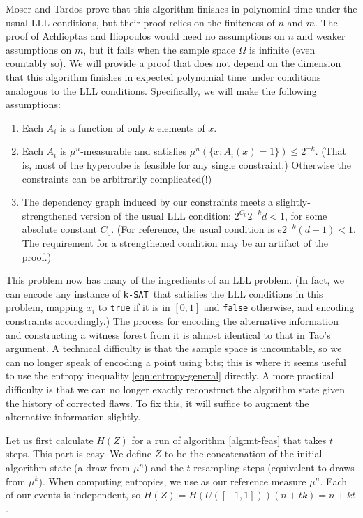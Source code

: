 \documentclass[twocolumn]{article}
\newcommand{\ksat}{\texttt{k-SAT}~}
\begin{document}
Moser and Tardos prove that this algorithm finishes in polynomial time under the usual LLL conditions, but their proof relies on the finiteness of $n$ and $m$.  The proof of Achlioptas and Iliopoulos would need no assumptions on $n$ and weaker assumptions on $m$, but it fails when the sample space $\Omega$ is infinite (even countably so).  We will provide a proof that does not depend on the dimension that this algorithm finishes in expected polynomial time under conditions analogous to the LLL conditions.  Specifically, we will make the following assumptions:
\begin{enumerate}
  \item Each $A_i$ is a function of only $k$ elements of $x$.  \label{eqn:feas-sparsity-condition}
  \item Each $A_i$ is $\mu^n$-measurable and satisfies $\mu^n(\{x: A_i(x) = 1\}) \leq 2^{-k}$.  (That is, most of the hypercube is feasible for any single constraint.)  Otherwise the constraints can be arbitrarily complicated(!)  \label{eqn:feas-margprob-condition}
  \item The dependency graph induced by our constraints meets a slightly-strengthened version of the usual LLL condition: $2^{C_0} 2^{-k} d < 1$, for some absolute constant $C_0$.  (For reference, the usual condition is $e 2^{-k} (d + 1) < 1$.  The requirement for a strengthened condition may be an artifact of the proof.) \label{eqn:feas-lowdep-condition}
\end{enumerate}

This problem now has many of the ingredients of an LLL problem.  (In fact, we can encode any instance of \ksat that satisfies the LLL conditions in this problem, mapping $x_i$ to \texttt{true} if it is in $[0,1]$ and \texttt{false} otherwise, and encoding constraints accordingly.)  The process for encoding the alternative information and constructing a witness forest from it is almost identical to that in Tao's argument.  A technical difficulty is that the sample space is uncountable, so we can no longer speak of encoding a point using bits; this is where it seems useful to use the entropy inequality \ref{eqn:entropy-general} directly.  A more practical difficulty is that we can no longer exactly reconstruct the algorithm state given the history of corrected flaws.  To fix this, it will suffice to augment the alternative information slightly.

Let us first calculate $H(Z)$ for a run of algorithm \ref{alg:mt-feas} that takes $t$ steps.  This part is easy.  We define $Z$ to be the concatenation of the initial algorithm state (a draw from $\mu^n$) and the $t$ resampling steps (equivalent to draws from $\mu^k$).  When computing entropies, we use as our reference measure $\mu^n$.  Each of our events is independent, so $H(Z) = H(U([-1,1])) (n + t k) = n + k t$.
\end{document}
